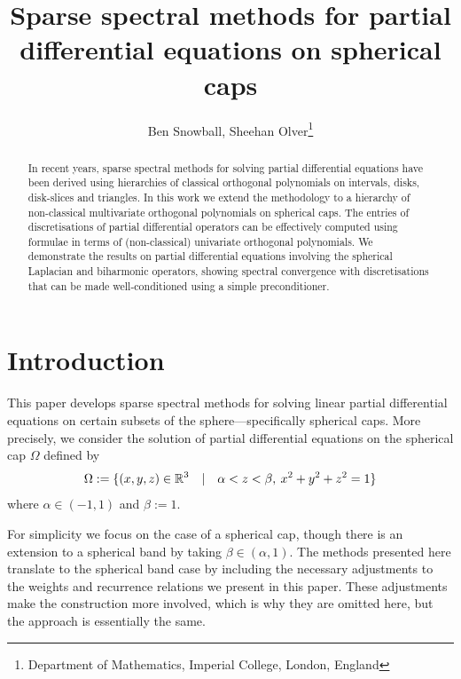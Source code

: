 \documentclass[11pt, oneside]{article}   	%
\title{Sparse spectral methods for partial differential equations on spherical caps}
\author{Ben Snowball, Sheehan Olver\thanks{Department of Mathematics, Imperial College, London, England}}
\begin{document}
\maketitle

\begin{abstract}
In recent years, sparse spectral methods for solving partial differential equations have been derived using hierarchies of classical orthogonal polynomials on intervals, disks, disk-slices and triangles. In this work we extend the methodology to a hierarchy of non-classical multivariate orthogonal polynomials on spherical caps. The entries of discretisations of partial differential operators can be effectively computed using formulae in terms of (non-classical) univariate orthogonal polynomials. We demonstrate the results on partial differential equations involving the spherical Laplacian and biharmonic operators, showing spectral convergence with  discretisations that can be made well-conditioned using a simple preconditioner. 
\end{abstract}


%
\section{Introduction}

This paper develops sparse spectral methods for solving linear partial differential equations on certain subsets of the sphere---specifically spherical caps. More precisely, we consider the solution of partial differential equations on the spherical cap $\Omega$ defined by
\begin{align*}
	\Omega := \{(x,y,z) \in \mathbb{R}^3 \quad | \quad \alpha < z < \beta, \: x^2 + y^2 + z^2 = 1\}
\end{align*}
where $\alpha \in (-1,1)$ and $\beta := 1$.

\begin{remark}
For simplicity we focus on the case of a spherical cap, though there is an extension to a spherical band by taking $\beta \in (\alpha,1)$. The methods presented here translate to the spherical band case by including the necessary adjustments to the weights and recurrence relations we present in this paper. These adjustments make the construction more involved, which is why they are omitted here, but the approach is essentially the same.
\end{remark}
\end{document}
